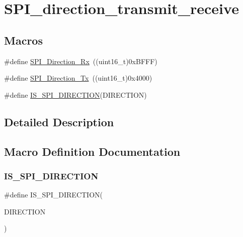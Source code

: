 \hypertarget{group___s_p_i__direction__transmit__receive}{}\section{S\+P\+I\+\_\+direction\+\_\+transmit\+\_\+receive}
\label{group___s_p_i__direction__transmit__receive}
\subsection*{Macros}
\begin{DoxyCompactItemize}
\item 
\#define \mbox{\hyperlink{group___s_p_i__direction__transmit__receive_ga9a59d225a8cf42eebafbec6ad95c078c}{S\+P\+I\+\_\+\+Direction\+\_\+\+Rx}}~((uint16\+\_\+t)0x\+B\+F\+F\+F)
\item 
\#define \mbox{\hyperlink{group___s_p_i__direction__transmit__receive_gabd76982a7e305c13f7ad8ea1789d3c0c}{S\+P\+I\+\_\+\+Direction\+\_\+\+Tx}}~((uint16\+\_\+t)0x4000)
\item 
\#define \mbox{\hyperlink{group___s_p_i__direction__transmit__receive_gae96b69403c4206e347cde77b9a30e207}{I\+S\+\_\+\+S\+P\+I\+\_\+\+D\+I\+R\+E\+C\+T\+I\+ON}}(D\+I\+R\+E\+C\+T\+I\+ON)
\end{DoxyCompactItemize}


\subsection{Detailed Description}


\subsection{Macro Definition Documentation}
\mbox{\label{group___s_p_i__direction__transmit__receive_gae96b69403c4206e347cde77b9a30e207}} 
\subsubsection{\texorpdfstring{IS\_SPI\_DIRECTION}{IS\_SPI\_DIRECTION}}
{\footnotesize\ttfamily \#define I\+S\+\_\+\+S\+P\+I\+\_\+\+D\+I\+R\+E\+C\+T\+I\+ON(\begin{DoxyParamCaption}\item[{}]{D\+I\+R\+E\+C\+T\+I\+ON }\end{DoxyParamCaption})}

